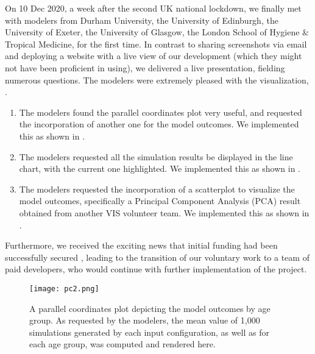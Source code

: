 On 10 Dec 2020, a week after the second UK national lockdown, we finally met with modelers from Durham University, the University of Edinburgh, the University of Exeter, the University of Glasgow, the London School of Hygiene \& Tropical Medicine, for the first time.
In contrast to sharing screenshots via email and deploying a website with a live view of our development (which they might not have been proficient in using), we delivered a live presentation, fielding numerous questions.
The modelers were extremely pleased with the visualization, .
\begin{enumerate}
    \item The modelers found the parallel coordinates plot very useful, and requested the incorporation of another one for the model outcomes.  We implemented this as shown in .
    \item The modelers requested all the simulation results be displayed in the line chart, with the current one highlighted.  We implemented this as shown in .
    \item The modelers requested the incorporation of a scatterplot to visualize the model outcomes, specifically a Principal Component Analysis (PCA) result obtained from another VIS volunteer team.  We implemented this as shown in .
\end{enumerate}

Furthermore, we received the exciting news that initial funding had been successfully secured \cite{engineering&physicalsciencesresearchcouncil2021RAMP}, leading to the transition of our voluntary work to a team of paid developers, who would continue with further implementation of the project.

\begin{figure}[tb!]
    \centering
    \texttt{[image: pc2.png]}
    \caption{A parallel coordinates plot depicting the model outcomes by age group. As requested by the modelers, the mean value of 1,000 simulations generated by each input configuration, as well as for each age group, was computed and rendered here. 
    }
    \label{fig:pc2}

\end{figure}

